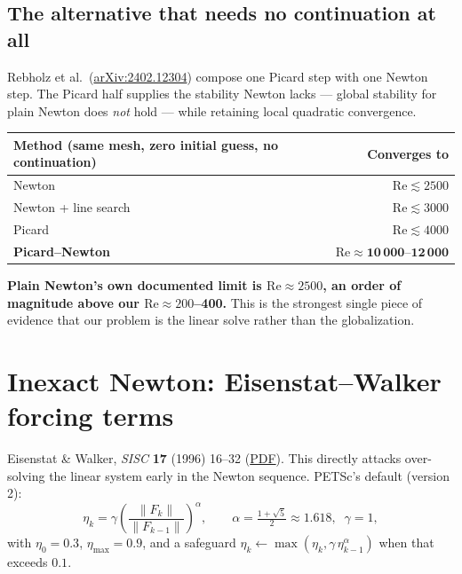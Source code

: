 \documentclass[11pt,a4paper]{article}
\newcommand{\Rey}{\mathrm{Re}}
\begin{document}
\subsection{The alternative that needs no continuation at all}
Rebholz et al.\ (\href{https://arxiv.org/pdf/2402.12304}{arXiv:2402.12304}) compose one Picard
step with one Newton step. The Picard half supplies the stability Newton lacks --- global
stability for plain Newton does \emph{not} hold --- while retaining local quadratic
convergence.
\begin{center}
\begin{tabular}{@{}lr@{}}
\toprule
Method (same mesh, zero initial guess, no continuation) & Converges to \\
\midrule
Newton & $\Rey \lesssim 2500$ \\
Newton + line search & $\Rey \lesssim 3000$ \\
Picard & $\Rey \lesssim 4000$ \\
\textbf{Picard--Newton} & $\mathbf{\Rey \approx 10\,000\text{--}12\,000}$ \\
\bottomrule
\end{tabular}
\end{center}
\textbf{Plain Newton's own documented limit is $\Rey\approx2500$, an order of magnitude above
our $\Rey\approx200$--400.} This is the strongest single piece of evidence that our problem is
the linear solve rather than the globalization.

\section{Inexact Newton: Eisenstat--Walker forcing terms}
Eisenstat \& Walker, \emph{SISC} \textbf{17} (1996) 16--32
(\href{https://users.wpi.edu/~walker/Papers/forcing_terms,SISC_17,1996,16-32.pdf}{PDF}). This
directly attacks over-solving the linear system early in the Newton sequence. PETSc's default
(version 2):
\begin{equation}
\eta_k = \gamma \left( \frac{\lVert F_k\rVert}{\lVert F_{k-1}\rVert} \right)^{\alpha},
\qquad \alpha = \tfrac{1+\sqrt 5}{2} \approx 1.618,\;\; \gamma = 1,
\end{equation}
with $\eta_0 = 0.3$, $\eta_{\max} = 0.9$, and a safeguard
$\eta_k \leftarrow \max(\eta_k, \gamma\,\eta_{k-1}^{\alpha})$ when that exceeds $0.1$.
\end{document}
